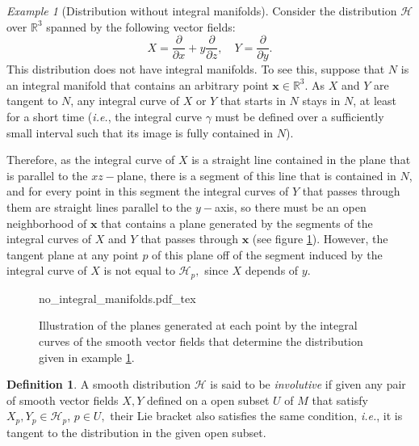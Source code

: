 \documentclass[12pt, letterpaper, reqno]{amsart}
\newcommand{\incfig}[2][1]{%
    \def\svgwidth{#1\columnwidth}
    {#2.pdf_tex}
}
\theoremstyle{definition}
\newtheorem{df}{Definition}
\theoremstyle{plain}
\theoremstyle{remark}
\newtheorem{ex}{Example}
\begin{document}
\begin{ex}[Distribution without integral manifolds] \label{ex:no_integral_manifolds}
	Consider the distribution $ \mathcal{H} $ over $ \mathbb{R}^3 $ spanned by the following vector fields: 
	$$ X = \frac{\partial}{\partial x} + y \frac{\partial}{\partial z}, \quad Y = \frac{\partial}{\partial y}.  $$ 
	This distribution does not have integral manifolds. To see this, suppose that $ N $ is an integral manifold that contains an arbitrary point $ \textbf{x} \in \mathbb{R}^3.  $ As $ X $ and $ Y $ are tangent to $ N $, any integral curve of $ X $ or $ Y $ that starts in $ N $ stays in $ N $, at least for a short time (\textit{i.e.}, the integral curve $ \gamma $ must be defined over a sufficiently small interval such that its image is fully contained in $ N $).   

	Therefore, as the integral curve of $ X $ is a straight line contained in the plane that is parallel to the $ xz- $plane, there is a segment of this line that is contained in $ N $, and for every point in this segment the integral curves of $ Y $ that passes through them are straight lines parallel to the $ y- $axis, so there must be an open neighborhood of $ \textbf{x}  $ that contains a plane generated by the segments of the integral curves of $ X $ and $ Y $ that passes through $ \textbf{x}$ (see figure \ref{fig:no_integral_manifolds}). However, the tangent plane at any point $ p $  of this plane  off of the segment induced by the integral curve of $ X $ is not equal to $ \mathcal{H}_p, $ since $ X $ depends of $ y $.   
\end{ex}

\begin{figure}
    \centering
    \incfig{no_integral_manifolds}
    \caption{Illustration of the planes generated at each point by the integral curves of the smooth vector fields that determine the distribution given in example \ref{ex:no_integral_manifolds}.}
    \label{fig:no_integral_manifolds}
\end{figure}

\begin{df}
	
A smooth distribution $ \mathcal{H} $ is said to be \textit{involutive} if given any pair of smooth vector fields $ X,Y $ defined on a open subset $ U $  of $ M $  that satisfy $X_p,Y_p\in \mathcal{H}_p $, $ p\in U, $ their Lie bracket also satisfies the same condition, \textit{i.e.}, it is tangent to the distribution in the given open subset. 
\end{df}
\end{document}
